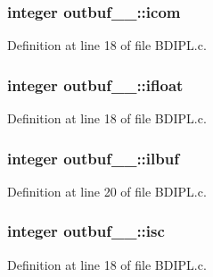 \subsubsection[{\texorpdfstring{icom}{icom}}]{\setlength{\rightskip}{0pt plus 5cm}integer outbuf\+\_\+\_\+\+::icom}\hypertarget{structoutbuf__1___a17f3b29c4b003845003f61d478526430}{}\label{structoutbuf__1___a17f3b29c4b003845003f61d478526430}


Definition at line 18 of file B\+D\+I\+P\+L.\+c.

\subsubsection[{\texorpdfstring{ifloat}{ifloat}}]{\setlength{\rightskip}{0pt plus 5cm}integer outbuf\+\_\+\_\+\+::ifloat}\hypertarget{structoutbuf__1___a7ab888b47ccedaee0f7929f9ca031dce}{}\label{structoutbuf__1___a7ab888b47ccedaee0f7929f9ca031dce}


Definition at line 18 of file B\+D\+I\+P\+L.\+c.

\subsubsection[{\texorpdfstring{ilbuf}{ilbuf}}]{\setlength{\rightskip}{0pt plus 5cm}integer outbuf\+\_\+\_\+\+::ilbuf}\hypertarget{structoutbuf__1___a5decb0070d3105fbffb4c2671b5df124}{}\label{structoutbuf__1___a5decb0070d3105fbffb4c2671b5df124}


Definition at line 20 of file B\+D\+I\+P\+L.\+c.

\subsubsection[{\texorpdfstring{isc}{isc}}]{\setlength{\rightskip}{0pt plus 5cm}integer outbuf\+\_\+\_\+\+::isc}\hypertarget{structoutbuf__1___ae282bba1de4bec18652d5f15db9d42ee}{}\label{structoutbuf__1___ae282bba1de4bec18652d5f15db9d42ee}


Definition at line 18 of file B\+D\+I\+P\+L.\+c.

